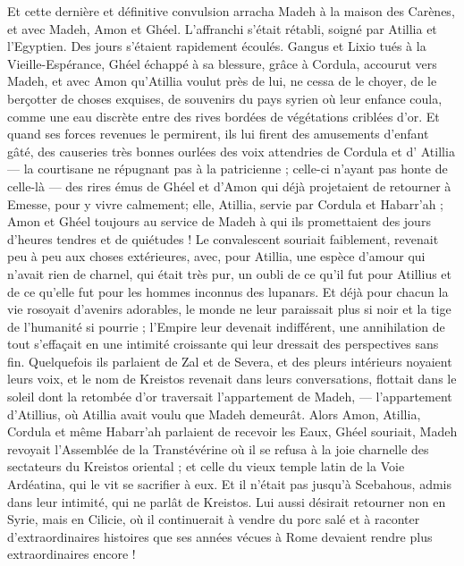 \documentclass[a4paper, 11pt, oneside, polutonikogreek, french]{article}
\begin{document}
Et cette dernière et définitive convulsion arracha Madeh à la maison des Carènes, et avec Madeh, Amon et Ghéel. L'affranchi s'était rétabli, soigné par Atillia et l'Egyptien. Des jours s'étaient rapidement écoulés. Gangus et Lixio tués à la Vieille-Espérance, Ghéel échappé à sa blessure, grâce à Cordula, accourut vers Madeh, et avec Amon qu'Atillia voulut près de lui, ne cessa de le choyer, de le berçotter de choses exquises, de souvenirs du pays syrien où leur enfance coula, comme une eau discrète entre des rives bordées de végétations criblées d'or. Et quand ses forces revenues le permirent, ils lui firent des amusements d'enfant gâté, des causeries très bonnes ourlées des voix attendries de Cordula et d' Atillia --- la courtisane ne répugnant pas à la patricienne ; celle-ci n'ayant pas honte de celle-là --- des rires émus de Ghéel et d'Amon qui déjà projetaient de retourner à Emesse, pour y vivre calmement; elle, Atillia, servie par Cordula et Habarr'ah ; Amon et Ghéel toujours au service de Madeh à qui ils promettaient des jours d'heures tendres et de quiétudes ! Le convalescent souriait faiblement, revenait peu à peu aux choses extérieures, avec, pour Atillia, une espèce d'amour qui n'avait rien de charnel, qui était très pur, un oubli de ce qu'il fut pour Atillius et de ce qu'elle fut pour les hommes inconnus des lupanars. Et déjà pour chacun la vie rosoyait d'avenirs adorables, le monde ne leur paraissait plus si noir et la tige de l'humanité si pourrie ; l'Empire leur devenait indifférent, une annihilation de tout s'effaçait en une intimité croissante qui leur dressait des perspectives sans fin. Quelquefois ils parlaient de Zal et de Severa, et des pleurs intérieurs noyaient leurs voix, et le nom de Kreistos revenait dans leurs conversations, flottait dans le soleil dont la retombée d'or traversait l'appartement de Madeh, --- l'appartement d'Atillius, où Atillia avait voulu que Madeh demeurât. Alors Amon, Atillia, Cordula et même Habarr'ah parlaient de recevoir les Eaux, Ghéel souriait, Madeh revoyait l'Assemblée de la Transtévérine où il se refusa à la joie charnelle des sectateurs du Kreistos oriental ; et celle du vieux temple latin de la Voie Ardéatina, qui le vit se sacrifier à eux. Et il n'était pas jusqu'à Scebahous, admis dans leur intimité, qui ne parlât de Kreistos. Lui aussi désirait retourner non en Syrie, mais en Cilicie, où il continuerait à vendre du porc salé et à raconter d'extraordinaires histoires que ses années vécues à Rome devaient rendre plus extraordinaires encore !
\clearpage
\subsection{}
\end{document}
